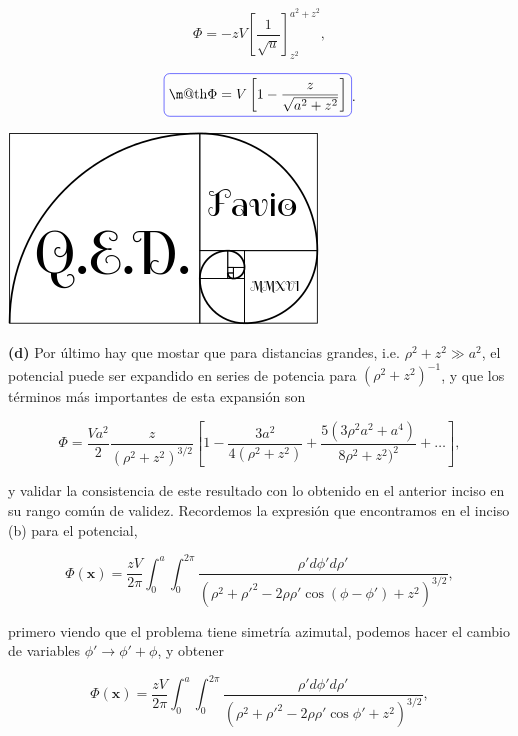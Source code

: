 \documentclass[a4paper,10pt]{article}
\makeatletter
\numberwithin{equation}{section}
\newcommand*{\boxcolor}{blue}
\renewcommand{\boxed}[1]{\textcolor{\boxcolor}{%
\tikz[baseline={([yshift=-1ex]current bounding box.center)}] \node [rectangle, minimum width=1ex,rounded corners,draw] {\normalcolor\m@th$\displaystyle#1$};}}
\makeatother
\begin{document}
\begin{equation}
 \Phi = - zV \left[\frac{1}{\sqrt{u}}\right]_{z^2}^{a^2+z^2},
\end{equation}

\begin{equation}
 \boxed{\Phi = V\left[1 - \frac{z}{\sqrt{a^2 + z^2}} \right]}.
\end{equation}

\hspace{10cm}\includegraphics[scale=0.2]{logoQED}

\textbf{(d)} Por último hay que mostar que para distancias grandes, 
i.e. $\rho^2 + z^2 \gg a^2$, el potencial puede ser expandido en series 
de potencia para $(\rho^2 + z^2)^{-1}$, y que los términos más importantes 
de esta expansión son 

\begin{equation}
 \Phi = \frac{Va^2}{2}\frac{z}{(\rho^2 + z^2)^{3/2}}\left[1 - 
 \frac{3a^2}{4(\rho^2 + z^2)} + \frac{5(3\rho^2a^2+a^4)}{8\rho^2 + z^2)^2} 
 + \dots \right],
\end{equation}

y validar la consistencia de este resultado con lo obtenido en el anterior 
inciso en su rango común de validez. Recordemos la expresión que 
encontramos en el inciso (b) para el potencial, 

\begin{equation}
 \Phi(\mathbf{x}) = \frac{zV}{2\pi}\int_0^a\int_0^{2\pi} 
 \frac{\rho' d\phi' d\rho'}{(\rho^2 + \rho'^2 - 2\rho\rho'\cos{(\phi - \phi')} + 
 z^2)^{3/2}},
\end{equation}

primero viendo que el problema tiene simetría azimutal, podemos hacer 
el cambio de variables $\phi' \rightarrow \phi' + \phi$, y obtener 

\begin{equation}
 \Phi(\mathbf{x}) = \frac{zV}{2\pi}\int_0^a\int_0^{2\pi} 
 \frac{\rho' d\phi' d\rho'}{(\rho^2 + \rho'^2 - 2\rho\rho'\cos{\phi'} + 
 z^2)^{3/2}},
\end{equation}
\end{document}
